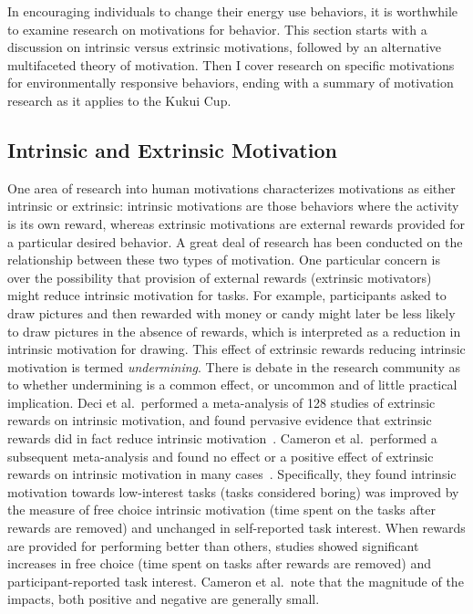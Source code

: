 In encouraging individuals to change their energy use behaviors, it is worthwhile to examine research on motivations for behavior. This section starts with a discussion on intrinsic versus extrinsic motivations, followed by an alternative multifaceted theory of motivation. Then I cover research on specific motivations for environmentally responsive behaviors, ending with a summary of motivation research as it applies to the Kukui Cup.


\subsection{Intrinsic and Extrinsic Motivation}

One area of research into human motivations characterizes motivations as either intrinsic or extrinsic: intrinsic motivations are those behaviors where the activity is its own reward, whereas extrinsic motivations are external rewards provided for a particular desired behavior. A great deal of research has been conducted on the relationship between these two types of motivation. One particular concern is over the possibility that provision of external rewards (extrinsic motivators) might reduce intrinsic motivation for tasks. For example, participants asked to draw pictures and then rewarded with money or candy might later be less likely to draw pictures in the absence of rewards, which is interpreted as a reduction in intrinsic motivation for drawing. This effect of extrinsic rewards reducing intrinsic motivation is termed \emph{undermining}. There is debate in the research community as to whether undermining is a common effect, or uncommon and of little practical implication. Deci et al.\ performed a meta-analysis of 128 studies of extrinsic rewards on intrinsic motivation, and found pervasive evidence that extrinsic rewards did in fact reduce intrinsic motivation~\cite{Deci1999}. Cameron et al.\ performed a subsequent meta-analysis and found no effect or a positive effect of extrinsic rewards on intrinsic motivation in many cases~\cite{Cameron2001}. Specifically, they found intrinsic motivation towards low-interest tasks (tasks considered boring) was improved by the measure of free choice intrinsic motivation (time spent on the tasks after rewards are removed) and unchanged in self-reported task interest. When rewards are provided for performing better than others, studies showed significant increases in free choice (time spent on tasks after rewards are removed) and participant-reported task interest. Cameron et al.\ note that the magnitude of the impacts, both positive and negative are generally small.


